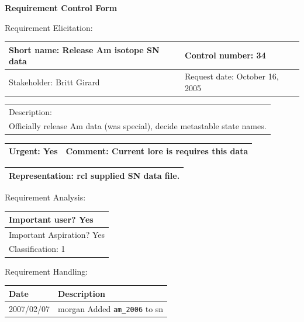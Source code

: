 \begin{center}\Large\bf
Requirement Control Form
\end{center}
\vspace{24pt}

Requirement Elicitation:

\begin{tabular}{|p{211pt}|p{211pt}|} \hline
Short name: Release Am isotope SN data & Control number: 34\\ \hline
Stakeholder: Britt Girard & Request date: October 16, 2005\\
\end{tabular}
\begin{tabular}{|p{433pt}|} \hline
Description: \\ 
Officially release Am data (was special), decide metastable state
names.\\
\hline
\end{tabular} 
\begin{tabular}{|p{211pt}|p{211pt}|} \hline
Urgent: Yes & Comment: Current lore is requires this data \\ \hline
\end{tabular}

\vspace{12pt}

\begin{tabular}{|p{433pt}|} \hline
Representation: rcl supplied SN data file. \\ \hline
\end{tabular}
\vspace{24pt}

Requirement Analysis:

\begin{tabular}{|p{433pt}|} \hline
Important user? Yes \\ \hline
Important Aspiration? Yes \\ \hline
Classification: 1 \\ \hline
\end{tabular}
\vspace{24pt}

Requirement Handling:

\begin{tabular}{|p{72pt}|p{351pt}|} \hline
Date & Description \\ \hline
2007/02/07 & morgan Added \texttt{am\_2006} to sn\\ \hline
\end{tabular}
